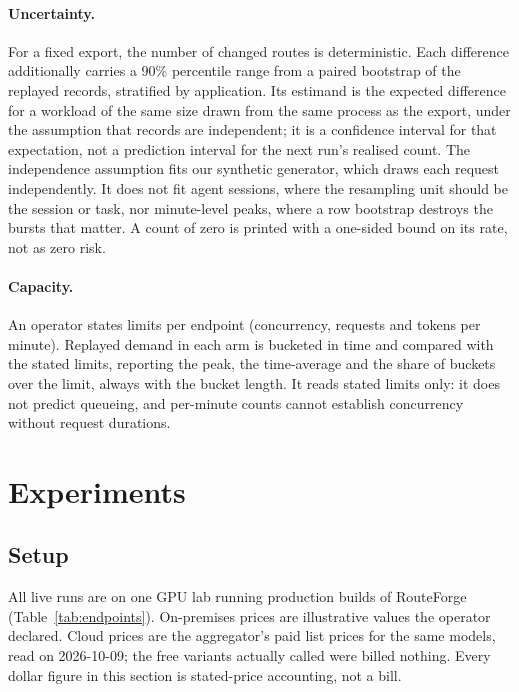 \documentclass[11pt]{article}
\begin{document}
\paragraph{Uncertainty.} For a fixed export, the number of changed routes is deterministic.
Each difference additionally carries a 90\% percentile range from a paired bootstrap of the
replayed records, stratified by application. Its estimand is the expected difference for a
workload of the same size drawn from the same process as the export, under the assumption that
records are independent; it is a confidence interval for that expectation, not a prediction
interval for the next run's realised count. The independence assumption fits our synthetic
generator, which draws each request independently. It does not fit agent sessions, where the
resampling unit should be the session or task, nor minute-level peaks, where a row bootstrap
destroys the bursts that matter. A count of zero is printed with a one-sided bound on its
rate, not as zero risk.

\paragraph{Capacity.} An operator states limits per endpoint (concurrency, requests and tokens
per minute). Replayed demand in each arm is bucketed in time and compared with the stated
limits, reporting the peak, the time-average and the share of buckets over the limit, always
with the bucket length. It reads stated limits only: it does not predict queueing, and per-minute
counts cannot establish concurrency without request durations.

\section{Experiments}
\label{sec:exp}

\subsection{Setup}

All live runs are on one GPU lab running production builds of RouteForge
(Table~\ref{tab:endpoints}). On-premises prices are illustrative values the operator declared.
Cloud prices are the aggregator's paid list prices for the same models, read on 2026-10-09; the
free variants actually called were billed nothing. Every dollar figure in this section is
stated-price accounting, not a bill.
\end{document}
